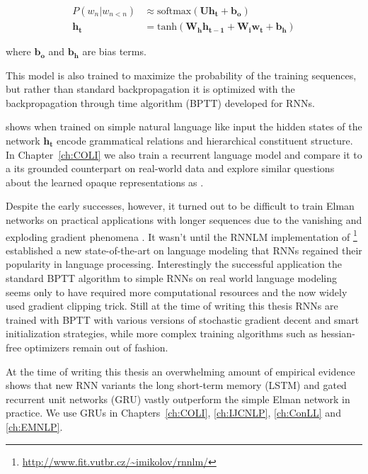 \begin{align}
P(w_n|w_{n<n}) &\approx \text{softmax}(\mathbf{U} \mathbf{h_t} + \mathbf{b_o}) \\
\mathbf{h_t} &= \text{tanh}(\mathbf{W_h}\mathbf{h_{t-1}} + \mathbf{W_i}\mathbf{w_t} + \mathbf{b_h})
\end{align}

where $ \mathbf{b_o}$ and $ \mathbf{b_h}$ are bias terms.

This model is also trained to maximize the probability of the training sequences, but rather than standard
backpropagation it is optimized with the backpropagation through time algorithm (BPTT)
\citep{robinson1987utility,werbos1988generalization,williams1995gradient} developed for RNNs.

\cite{elman1991distributed} shows when trained on simple natural language like input the
hidden states of the network $\mathbf{h_t}$ encode grammatical relations and hierarchical
constituent structure. In Chapter~\ref{ch:COLI} we also train a recurrent language model
and compare it to a its grounded counterpart
on real-world data and explore similar questions about the learned opaque representations
as \cite{elman1991distributed} .

Despite the early successes, however, it turned out to be difficult to train
Elman networks on practical applications with longer sequences
due to the vanishing and exploding gradient phenomena \citep{bengio1994learning}.
It  wasn't until the RNNLM implementation of \cite{mikolov2010recurrent}\footnote{\url{http://www.fit.vutbr.cz/~imikolov/rnnlm/}}
established a new state-of-the-art on language modeling that RNNs regained their popularity
in language processing.  Interestingly the successful
application the standard BPTT algorithm
to simple RNNs on real world language modeling \cite{mikolov2012statistical}
seems  only to have required more computational resources and
the now widely used gradient clipping trick. Still at the time of writing this thesis RNNs are
trained with BPTT with various versions of stochastic gradient decent and smart initialization
strategies, while more complex training algorithms such as hessian-free optimizers
\citep{martens2011learning} remain out of fashion.

At the time of writing this thesis an overwhelming amount of empirical evidence
shows that new RNN variants the long short-term
memory (LSTM) \citep{hochreiter1997long,gers1999learning}
and gated recurrent unit networks (GRU) \citep{cho2014learning}
vastly outperform the simple Elman network in practice. We use GRUs in
Chapters~\ref{ch:COLI}, \ref{ch:IJCNLP}, \ref{ch:ConLL} and \ref{ch:EMNLP}.

